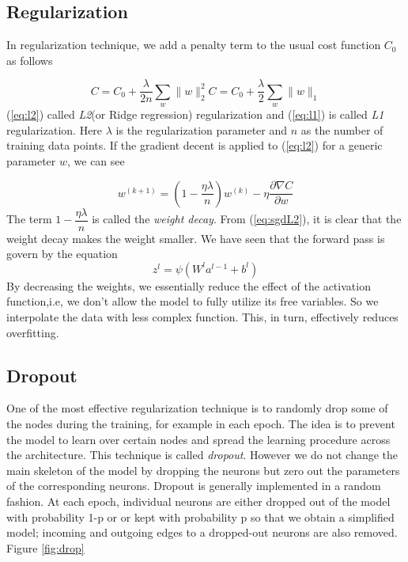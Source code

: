 \documentclass[12pt]{article}
\begin{document}
\subsection{Regularization}

In regularization technique, we add a penalty term to the usual cost function $C_{0}$ as follows

\begin{subequations}
\begin{equation}
\label{eq:l2}
C = C_{0} + \dfrac{\lambda}{2n}\sum\limits_{w}\|w\|^{2}_{2}
\end{equation}

\begin{equation}
\label{eq:l1}
C = C_{0} + \dfrac{\lambda}{2}\sum\limits_{w}\|w\|_{1}
\end{equation}
\end{subequations}
(\ref{eq:l2}) called \textit{L2}(or Ridge regression) regularization and (\ref{eq:l1}) is called \textit{L1} regularization. Here $\lambda$ is the regularization parameter and $n$ as the number of training data points. If the gradient decent is applied to (\ref{eq:l2}) for a generic parameter $w$, we can see 

\begin{equation}
\label{eq:sgdL2}
w^{(k+1)} = (1-\dfrac{\eta \lambda}{n})w^{(k)} - \eta \dfrac{\partial \nabla C}{\partial w} 
\end{equation}
The term $1-\dfrac{\eta \lambda}{n}$ is called the \textit{weight decay}. From (\ref{eq:sgdL2}), it is clear that the weight decay makes the weight smaller.  We have seen that the forward pass is govern by the equation
$$
z^{l} = \psi(W^{l}a^{l-1}+b^{l})
$$
By decreasing the weights, we essentially reduce the effect of the activation function,i.e, we don't allow the model to fully utilize its free variables. So we interpolate the data with less complex function. This, in turn, effectively reduces overfitting. 

\subsection{Dropout}
One of the most effective regularization technique is to randomly drop some of the nodes during the training, for example in each epoch. The idea is to prevent the model to learn over certain nodes and spread the learning procedure across the architecture.  This technique is called \textit{dropout}. However we do not change the main skeleton of the model by dropping the neurons but zero out the parameters of the corresponding neurons. 
Dropout is generally implemented in a random fashion. At each epoch, individual neurons are either dropped out of the model with probability 1-p or or kept with probability p so that we obtain a simplified model; incoming and outgoing edges to a dropped-out neurons are also removed. Figure \ref{fig:drop}
\end{document}
